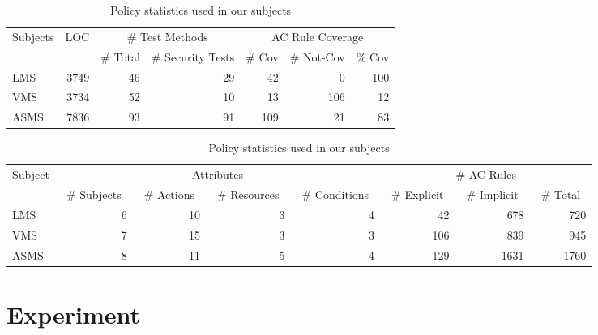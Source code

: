 \begin{table}[htbp]
  \centering
  	\caption{Subjects used in our evaluation}
  	\vspace{-8pt}    
    \begin{tabular}{|l|r|r|r||r|r|r|}
    \hline
    	\multirow{2}{*}{Subjects} & \multirow{2}{*}{LOC} & \multicolumn{2}{|c||}{ \# Test Methods} & \multicolumn{3}{|c|}{AC Rule Coverage} \\\cline{3-7}
    
          &  & \# Total & \# Security Tests & \# Cov & \# Not-Cov& \% Cov\\\hline\hline
    LMS   & 3749  & 46    & 29    & 42    & 0     & 100 \\\hline
    VMS   & 3734  & 52    & 10    & 13    & 106   & 12 \\\hline
    ASMS  & 7836  & 93    & 91    & 109   & 21    & 83 \\\hline
		\end{tabular}%
  \label{tab:subj}%
%

\vspace{+10pt}

  \centering
  \caption{Policy statistics used in our subjects}
  	\vspace{-8pt}   
    \begin{tabular}{|l|r|r|r|r||r|r|r|}
 		\hline
 		     \multirow{2}{*}{Subject} & \multicolumn{4}{|c||}{Attributes} & \multicolumn{3}{|c|}{\# AC Rules} \\\cline{2-8}
 		     
     & ~\# Subjects~ & ~\# Actions~ & ~\# Resources~ & ~\# Conditions~ & ~\# Explicit~ & ~\# Implicit~ & ~\# Total~ \\\hline\hline
    LMS   & 6     & 10    & 3     & 4     & 42    & 678   & 720 \\\hline
    VMS   & 7     & 15    & 3     & 3     & 106   & 839   & 945 \\\hline
    ASMS~  & 8     & 11    & 5     & 4     & 129   & 1631  & 1760 \\\hline
 
    \end{tabular}%
  \label{tab:subjectpolicies}%
\end{table}%


\section{Experiment}\label{sec:experiment}

